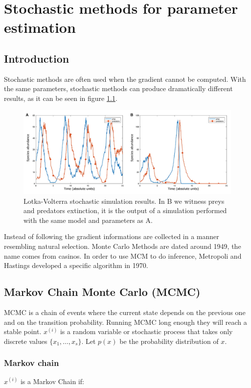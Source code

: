 \graphicspath{{chapters/11/images}}
\chapter{Stochastic methods for parameter estimation}

\section{Introduction}
Stochastic methods are often used when the gradient cannot be computed.
With the same parameters, stochastic methods can produce dramatically different results, as it can be seen in figure \ref{fig:res}.

\begin{figure}[H]
  \centering
  \includegraphics[width=\textwidth]{stoch_LV.png}
  \caption{Lotka-Volterra stochastic simulation results. In B we witness
  preys and predators extinction, it is the output of a simulation
  performed with the same model and parameters as A.}
\label{fig:res}
\end{figure}

Instead of following the gradient informations are collected in a manner resembling natural selection.
Monte Carlo Methods are dated around 1949, the name comes from casinos.
In order to use MCM to do inference, Metropoli and Hastings developed a specific algorithm in 1970.

\section{Markov Chain Monte Carlo (MCMC)}
MCMC is a chain of events where the current state depends on the previous one and on the transition probability.
Running MCMC long enough they will reach a stable point.
$x^{(i)}$ is a random variable or stochastic process that takes only discrete values $\{x_1,\dots,x_s\}$.
Let $p(x)$ be the probability distribution of $x$.

  \subsection{Markov chain}
  $x^{(i)}$ is a Markov Chain if:


